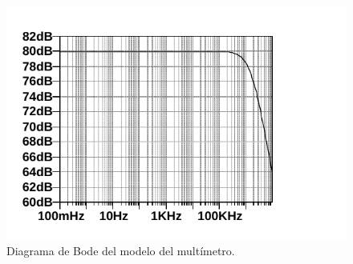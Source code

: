\begin{figure}[!h]
    \centering
    \includegraphics[width=\columnwidth]{img/graphs/voltmeter-model-bode.pdf}
    \caption{Diagrama de Bode del modelo del multímetro.}
    \label{fig:voltmeter-model-bode}
\end{figure}